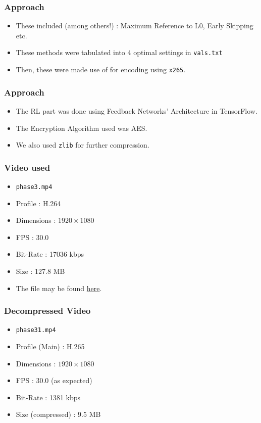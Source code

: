 \documentclass{beamer}
\begin{document}
\begin{frame}
    \frametitle{Approach}
    \begin{itemize}
        \item These included (among others!) :  Maximum Reference to L0, Early Skipping etc.
        \item These methods were tabulated into 4 optimal settings in \texttt{vals.txt}
        \item Then, these were made use of for encoding using \texttt{x265}.
    \end{itemize}
\end{frame}



\begin{frame}
    \frametitle{Approach}
    \begin{itemize}
        \item The RL part was done using Feedback Networks' Architecture in TensorFlow.
        \item The Encryption Algorithm used was AES.
        \item We also used \texttt{zlib} for further compression.
    \end{itemize}
\end{frame}


\begin{frame}
    \frametitle{Video used}
    \begin{itemize}
        \item \texttt{phase3.mp4}
        \item Profile : H.264
        \item Dimensions : $1920 \times 1080$
        \item FPS : 30.0
        \item Bit-Rate : 17036 kbps
        \item Size : 127.8 MB
        \item The file may be found \href{https://drive.google.com/file/d/14fxNcPJBfU-HgPigVKemZpu6zYA3YGQZ/view?usp=sharing}{here}.
    \end{itemize}
\end{frame}

\begin{frame}
    \frametitle{Decompressed Video}
    \begin{itemize}
        \item \texttt{phase31.mp4}
        \item Profile (Main) : H.265
        \item Dimensions : $1920 \times 1080$
        \item FPS : 30.0 (as expected)
        \item Bit-Rate : 1381 kbps
        \item Size (compressed) : 9.5 MB
    \end{itemize}

\end{frame}
\end{document}
